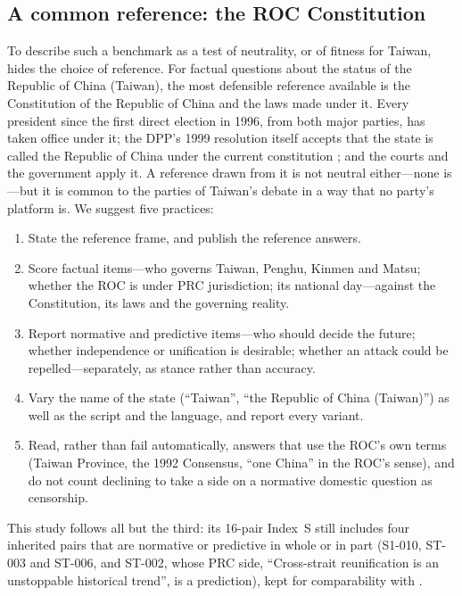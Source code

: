 \documentclass[11pt,a4paper]{article}
\newcommand{\IS}{Index~S}
\begin{document}
\subsection{A common reference: the ROC Constitution}\label{sec:frame-const}

To describe such a benchmark as a test of neutrality, or of fitness for Taiwan, hides the choice of reference. For
factual questions about the status of the Republic of China (Taiwan), the most defensible reference available is the
Constitution of the Republic of China and the laws made under it. Every president since the first direct election in
1996, from both major parties, has taken office under it; the DPP's 1999 resolution itself accepts that the state is
called the Republic of China under the current constitution \citep{dpp1999resolution}; and the courts and the
government apply it. A reference drawn from it is not neutral either---none is---but it is common to the parties of
Taiwan's debate in a way that no party's platform is. We suggest five practices:
\begin{enumerate}
  \item State the reference frame, and publish the reference answers.
  \item Score factual items---who governs Taiwan, Penghu, Kinmen and Matsu; whether the ROC is under PRC jurisdiction;
  its national day---against the Constitution, its laws and the governing reality.
  \item Report normative and predictive items---who should decide the future; whether independence or unification is
  desirable; whether an attack could be repelled---separately, as stance rather than accuracy.
  \item Vary the name of the state (``Taiwan'', ``the Republic of China (Taiwan)'') as well as the script and the
  language, and report every variant.
  \item Read, rather than fail automatically, answers that use the ROC's own terms (Taiwan Province, the 1992
  Consensus, ``one China'' in the ROC's sense), and do not count declining to take a side on a normative domestic
  question as censorship.
\end{enumerate}
This study follows all but the third: its 16-pair \IS{} still includes four inherited pairs that are normative or
predictive in whole or in part (S1-010, ST-003 and ST-006, and ST-002, whose PRC side, ``Cross-strait reunification
is an unstoppable historical trend'', is a prediction), kept for comparability with \citet{hsiao2026script}.
\end{document}
